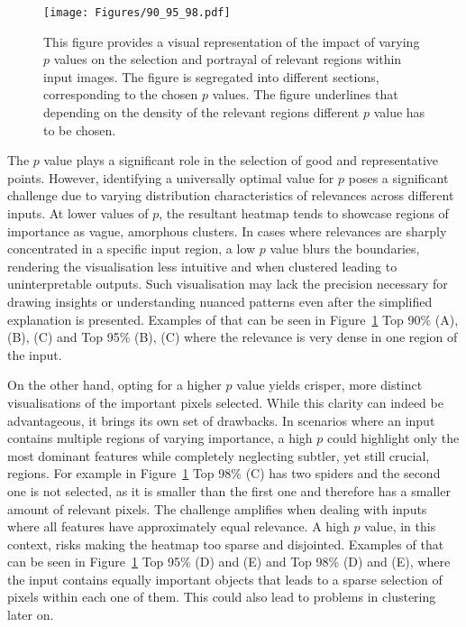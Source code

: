 \begin{figure}[ht!]
	\begin{center}
		\texttt{[image: Figures/90\_95\_98.pdf]}
	\end{center}
	\caption{This figure provides a visual representation of the impact of varying $p$ values on the selection and portrayal of relevant regions within input images. The figure is segregated into different sections, corresponding to the chosen $p$ values. The figure underlines that depending on the density of the relevant regions different $p$ value has to be chosen.}
	\label{Fig:90_95_NB}
\end{figure} 

The $p$ value plays a significant role in the selection of good and representative points. However, identifying a universally optimal value for $p$ poses a significant challenge due to varying distribution characteristics of relevances across different inputs. At lower values of $p$, the resultant heatmap tends to showcase regions of importance as vague, amorphous clusters. In cases where relevances are sharply concentrated in a specific input region, a low $p$ value blurs the boundaries, rendering the visualisation less intuitive and when clustered leading to uninterpretable outputs. Such visualisation may lack the precision necessary for drawing insights or understanding nuanced patterns even after the simplified explanation is presented. Examples of that can be seen in Figure~\ref{Fig:90_95_NB} Top 90\% (A), (B), (C) and Top 95\% (B), (C) where the relevance is very dense in one region of the input.

On the other hand, opting for a higher $p$ value yields crisper, more distinct visualisations of the important pixels selected. While this clarity can indeed be advantageous, it brings its own set of drawbacks. In scenarios where an input contains multiple regions of varying importance, a high $p$ could highlight only the most dominant features while completely neglecting subtler, yet still crucial, regions. For example in Figure~\ref{Fig:90_95_NB} Top 98\% (C) has two spiders and the second one is not selected, as it is smaller than the first one and therefore has a smaller amount of relevant pixels. The challenge amplifies when dealing with inputs where all features have approximately equal relevance. A high $p$ value, in this context, risks making the heatmap too sparse and disjointed. Examples of that can be seen in Figure~\ref{Fig:90_95_NB} Top 95\% (D) and (E) and Top 98\% (D) and (E), where the input contains equally important objects that leads to a sparse selection of pixels within each one of them. This could also lead to problems in clustering later on.


